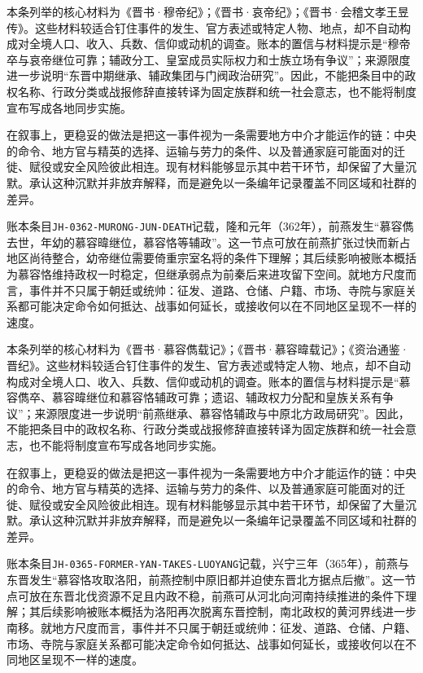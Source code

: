 本条列举的核心材料为《晋书·穆帝纪》；《晋书·哀帝纪》；《晋书·会稽文孝王昱传》。这些材料较适合钉住事件的发生、官方表述或特定人物、地点，却不自动构成对全境人口、收入、兵数、信仰或动机的调查。账本的置信与材料提示是“穆帝卒与哀帝继位可靠；辅政分工、皇室成员实际权力和士族立场有争议”；来源限度进一步说明“东晋中期继承、辅政集团与门阀政治研究”。因此，不能把条目中的政权名称、行政分类或战报修辞直接转译为固定族群和统一社会意志，也不能将制度宣布写成各地同步实施。

在叙事上，更稳妥的做法是把这一事件视为一条需要地方中介才能运作的链：中央的命令、地方官与精英的选择、运输与劳力的条件、以及普通家庭可能面对的迁徙、赋役或安全风险彼此相连。现有材料能够显示其中若干环节，却保留了大量沉默。承认这种沉默并非放弃解释，而是避免以一条编年记录覆盖不同区域和社群的差异。

账本条目\texttt{JH-0362-MURONG-JUN-DEATH}记载，隆和元年（362年），前燕发生“慕容儁去世，年幼的慕容暐继位，慕容恪等辅政”。这一节点可放在前燕扩张过快而新占地区尚待整合，幼帝继位需要倚重宗室名将的条件下理解；其后续影响被账本概括为慕容恪维持政权一时稳定，但继承弱点为前秦后来进攻留下空间。就地方尺度而言，事件并不只属于朝廷或统帅：征发、道路、仓储、户籍、市场、寺院与家庭关系都可能决定命令如何抵达、战事如何延长，或接收何以在不同地区呈现不一样的速度。

本条列举的核心材料为《晋书·慕容儁载记》；《晋书·慕容暐载记》；《资治通鉴·晋纪》。这些材料较适合钉住事件的发生、官方表述或特定人物、地点，却不自动构成对全境人口、收入、兵数、信仰或动机的调查。账本的置信与材料提示是“慕容儁卒、慕容暐继位和慕容恪辅政可靠；遗诏、辅政权力分配和皇族关系有争议”；来源限度进一步说明“前燕继承、慕容恪辅政与中原北方政局研究”。因此，不能把条目中的政权名称、行政分类或战报修辞直接转译为固定族群和统一社会意志，也不能将制度宣布写成各地同步实施。

在叙事上，更稳妥的做法是把这一事件视为一条需要地方中介才能运作的链：中央的命令、地方官与精英的选择、运输与劳力的条件、以及普通家庭可能面对的迁徙、赋役或安全风险彼此相连。现有材料能够显示其中若干环节，却保留了大量沉默。承认这种沉默并非放弃解释，而是避免以一条编年记录覆盖不同区域和社群的差异。

账本条目\texttt{JH-0365-FORMER-YAN-TAKES-LUOYANG}记载，兴宁三年（365年），前燕与东晋发生“慕容恪攻取洛阳，前燕控制中原旧都并迫使东晋北方据点后撤”。这一节点可放在东晋北伐资源不足且内政不稳，前燕可从河北向河南持续推进的条件下理解；其后续影响被账本概括为洛阳再次脱离东晋控制，南北政权的黄河界线进一步南移。就地方尺度而言，事件并不只属于朝廷或统帅：征发、道路、仓储、户籍、市场、寺院与家庭关系都可能决定命令如何抵达、战事如何延长，或接收何以在不同地区呈现不一样的速度。

